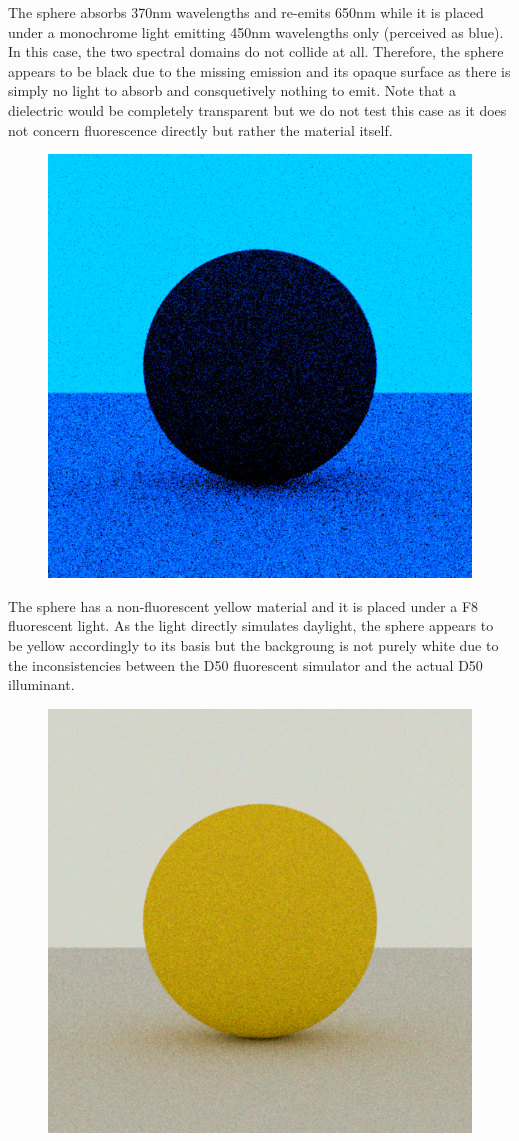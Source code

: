 \begin{description}
\begin{figure}[H]
		\caption{}
		\label{fig:fluorescent_sphere_mono_red}
	\end{figure}
	\item[450nm illuminant, 370nm absorption, 650 emission~\ref{fig:fluorescent_sphere_mono_invisible}] The sphere absorbs 370nm wavelengths and re-emits 650nm while it is placed under a monochrome light emitting 450nm wavelengths only (perceived as blue). In this case, the two spectral domains do not collide at all. Therefore, the sphere appears to be black due to the missing emission and its opaque surface as there is simply no light to absorb and consquetively nothing to emit. Note that a dielectric would be completely transparent but we do not test this case as it does not concern fluorescence directly but rather the material itself.
	\begin{figure}[H]
		\centering
		\includegraphics[width=.6\linewidth]{img/fluorescent_sphere_mono_invisible.png}
		\caption{}
		\label{fig:fluorescent_sphere_mono_invisible}
	\end{figure}
	\item[Fluo illuminant, non fluo sphere~\ref{fig:fluorescent_sphere_fluoD50_nonfluo}] The sphere has a non-fluorescent yellow material and it is placed under a F8 fluorescent light. As the light directly simulates daylight, the sphere appears to be yellow accordingly to its basis but the backgroung is not purely white due to the inconsistencies between the D50 fluorescent simulator and the actual D50 illuminant.
	\begin{figure}[H]
		\centering
		\includegraphics[width=.6\linewidth]{img/fluorescent_sphere_fluoD50_nonfluo.png}

\end{figure}
\end{description}
